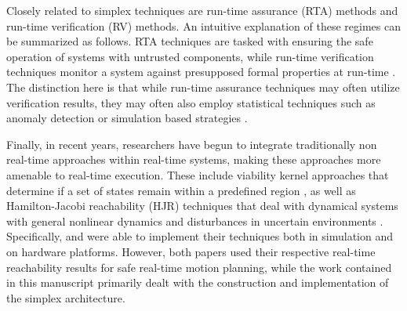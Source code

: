 \documentclass[manuscript,screen,review]{acmart}
\begin{document}

Closely related to simplex techniques are run-time assurance (RTA) methods and run-time verification (RV) methods. An intuitive explanation of these regimes can be summarized as follows. RTA techniques are tasked with ensuring the safe operation of systems with untrusted components, while run-time verification techniques monitor a system against presupposed formal properties at run-time 
\cite{Masson2018,Akametalu2014,mitsch,Daws1998,Phan2020}. The distinction here is that while run-time assurance techniques may often utilize verification results, they may often also employ statistical techniques such as anomaly detection \cite{boursinos2020trusted} or simulation based strategies \cite{TranSimulation2019}. %

Finally, in recent years, researchers have begun to integrate traditionally non real-time approaches within real-time systems, making these approaches more amenable to real-time execution. These include viability kernel approaches that determine if a set of states remain within a predefined region \cite{Gurriet2018,Althoff2014}, as well as Hamilton-Jacobi reachability (HJR) techniques that deal with dynamical systems with general nonlinear dynamics and disturbances in uncertain environments \cite{Herbert2019,Bajcsy2019Provably,bansal2020hamiltonjacobi,Fisac2017,Chen2016,dhinakaran2017hybrid}. Specifically, \cite{Bajcsy2019Provably} and \cite{Althoff2014} were able to implement their techniques both in simulation and on hardware platforms. However, both papers used their respective real-time reachability results for safe real-time motion planning, while the work contained in this manuscript primarily dealt with the construction and implementation of the simplex architecture. 
\end{document}
